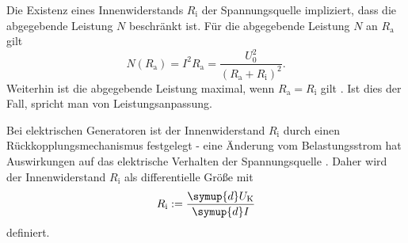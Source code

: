 Die Existenz eines Innenwiderstands $R_{\text{i}}$ der Spannungsquelle impliziert, dass die abgegebende Leistung $N$ beschränkt ist.
Für die abgegebende Leistung $N$ an $R_{\text{a}}$ gilt \cite{demi}
\begin{equation}
	N(R_{\text{a}}) = I^2 R_{\text{a}} = \frac{U_0^2}{(R_{\text{a}} + R_{\text{i}})^2} \text{.}
\end{equation}
Weiterhin ist die abgegebende Leistung maximal, wenn $R_{\text{a}} = R_{\text{i}}$ gilt \cite{demi}.
Ist dies der Fall, spricht man von Leistungsanpassung.

Bei elektrischen Generatoren ist der Innenwiderstand $R_{\text{i}}$ durch einen Rückkopplungsmechanismus festgelegt - eine Änderung vom Belastungsstrom hat Auswirkungen auf das elektrische Verhalten der Spannungsquelle \cite{Anleitung}. Daher wird der Innenwiderstand $R_{\text{i}}$ als differentielle Größe mit
\begin{equation}
	R_{\text{i}} := \frac{\symup{d}U_{\text{K}}}{\symup{d}I}
\end{equation}
definiert.
